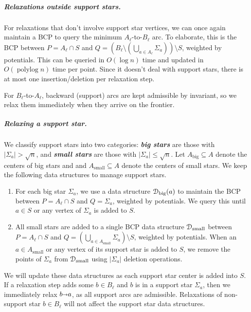 \documentclass[a4paper,UKenglish]{socg-lipics-v2018}
\def\polylog{\mathop{\mathrm{polylog}}}
\def\abs#1{\mathopen| #1 \mathclose|}		%
\def\arcto{\mathord\shortrightarrow}
\def\arc#1#2{#1\arcto#2}
\theoremstyle{plain}
\numberwithin{figure}{section}
\renewcommand{\paragraph}{\subparagraph}
\def\EMPH#1{\textbf{\emph{\boldmath #1}}}
\begin{document}
\paragraph{Relaxations outside support stars.}
For relaxations that don't involve support star vertices, we can once again
maintain a BCP to query the minimum $A_\ell$-to-$B_\ell$ arc.
To elaborate, this is the BCP between $P = A_\ell \cap S$ and
$Q = (B_\ell \setminus (\bigcup_{a \in A_\ell} \Sigma_a)) \setminus S$,
weighted by potentials.
This can be queried in $O(\log n)$ time and updated in $O(\polylog n)$ time per
point.
Since it doesn't deal with support stars, there is at most one
insertion/deletion per relaxation step.

For $B_\ell$-to-$A_\ell$, backward (support) arcs are kept admissible by
invariant, so we relax them immediately when they arrive on the frontier.

\paragraph{Relaxing a support star.}
We classify support stars into two categories: \EMPH{big stars} are those with
$\abs{\Sigma_a} > \sqrt{n}$, and \EMPH{small stars} are those with
$\abs{\Sigma_a} \leq \sqrt{n}$.
Let $A_\text{big} \subseteq A$ denote the centers of big stars and
and $A_\text{small} \subseteq A$ denote the centers of small stars.
We keep the following data structures to manage support stars.
\begin{enumerate}
\item For each big star $\Sigma_a$, we use a data structure
	$\EuScript{D}_\text{big}(a)$ to maintain the BCP between
	$P = A_\ell \cap S$ and $Q = \Sigma_a$, weighted by potentials.
	We query this until $a \in S$ or any vertex of $\Sigma_a$ is added to
	$S$.
\item All small stars are added to a single BCP data structure
	$\EuScript{D}_\text{small}$ between $P = A_\ell \cap S$ and
	$Q = (\bigcup_{a \in A_\text{small}} \Sigma_a) \setminus S$, weighted by
	potentials.
	When an $a \in A_\text{small}$ or any vertex of its support star is
	added to $S$, we remove the points of $\Sigma_a$ from
	$\EuScript{D}_\text{small}$ using $\abs{\Sigma_a}$ deletion operations.
\end{enumerate}
We will update these data structures as each support star center is added into
$S$.
If a relaxation step adds some $b \in B_\ell$ and $b$ is in a support star
$\Sigma_a$, then we immediately relax $\arc ba$, as all support arcs are
admissible.
Relaxations of non-support star $b \in B_\ell$ will not affect the support star
data structures.
\end{document}
